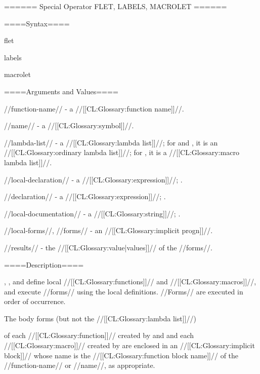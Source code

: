 ====== Special Operator FLET, LABELS, MACROLET ======

====Syntax====

\DefspecWithValuesNewline flet {} {}

\DefspecWithValuesNewline labels {} {}

\DefspecWithValuesNewline macrolet {} {}

====Arguments and Values====

//function-name// - a //[[CL:Glossary:function name]]//.

//name// - a //[[CL:Glossary:symbol]]//.

//lambda-list// - a //[[CL:Glossary:lambda list]]//; for  and , it is an //[[CL:Glossary:ordinary lambda list]]//; for , it is a //[[CL:Glossary:macro lambda list]]//.

//local-declaration// - a  //[[CL:Glossary:expression]]//; \noeval.

//declaration// - a  //[[CL:Glossary:expression]]//; \noeval.

//local-documentation// - a //[[CL:Glossary:string]]//; \noeval.

//local-forms//, //forms// - an //[[CL:Glossary:implicit progn]]//.

//results// - the //[[CL:Glossary:value|values]]// of the //forms//.

====Description====

, , and  define local //[[CL:Glossary:functions]]// and //[[CL:Glossary:macros]]//, and execute //forms// using the local definitions. //Forms// are executed in order of occurrence.

The body forms (but not the //[[CL:Glossary:lambda list]]//)

of each //[[CL:Glossary:function]]// created by  and  and each //[[CL:Glossary:macro]]// created by  are enclosed in an //[[CL:Glossary:implicit block]]// whose name is the //[[CL:Glossary:function block name]]// of the //function-name// or //name//, as appropriate.

